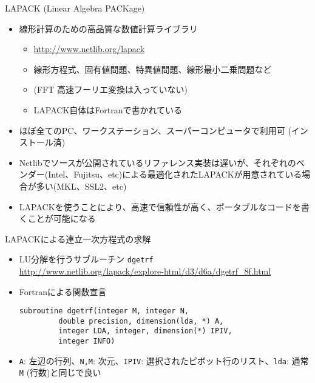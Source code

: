 \begin{frame}[t,fragile]{LAPACK (Linear Algebra PACKage)}
  \begin{itemize}
  \item 線形計算のための高品質な数値計算ライブラリ
    \begin{itemize}
    \item \url{http://www.netlib.org/lapack}
    \item 線形方程式、固有値問題、特異値問題、線形最小二乗問題など
    \item (FFT 高速フーリエ変換は入っていない)
    \item LAPACK自体はFortranで書かれている
    \end{itemize}
  \item ほぼ全てのPC、ワークステーション、スーパーコンピュータで利用可 (インストール済)
  \item Netlibでソースが公開されているリファレンス実装は遅いが、それぞれのベンダー(Intel、Fujitsu、etc)による最適化されたLAPACKが用意されている場合が多い(MKL、SSL2、etc)
  \item LAPACKを使うことにより、高速で信頼性が高く、ポータブルなコードを書くことが可能になる
  \end{itemize}
\end{frame}

\begin{frame}[t,fragile]{LAPACKによる連立一次方程式の求解}
  \begin{itemize}
    \setlength{\itemsep}{1em}
  \item LU分解を行うサブルーチン {\tt dgetrf} \\
    \url{http://www.netlib.org/lapack/explore-html/d3/d6a/dgetrf_8f.html}
  \item Fortranによる関数宣言
\begin{lstlisting}
subroutine dgetrf(integer M, integer N,
         double precision, dimension(lda, *) A,
         integer LDA, integer, dimension(*) IPIV,
         integer INFO)
\end{lstlisting}
\item {\tt A}: 左辺の行列、{\tt N,M}: 次元、{\tt IPIV}: 選択されたピボット行のリスト、{\tt lda}: 通常{\tt M} (行数)と同じで良い
  \end{itemize}
\end{frame}

